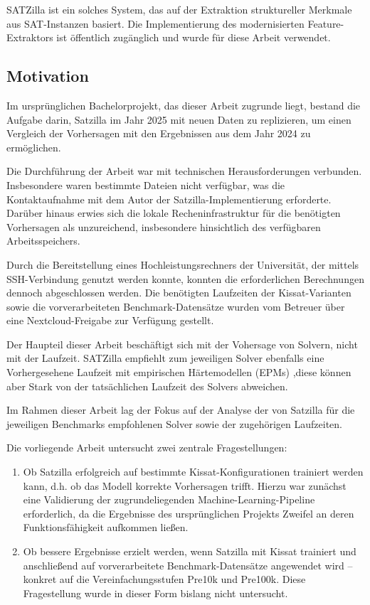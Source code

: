 SATZilla ist ein solches System, das auf der Extraktion struktureller Merkmale aus SAT-Instanzen 
basiert\cite{shavit2024satzilla}. Die Implementierung des modernisierten Feature-Extraktors ist 
öffentlich zugänglich und wurde für diese Arbeit verwendet.

\newpage

\subsection{Motivation}

Im ursprünglichen Bachelorprojekt, das dieser Arbeit zugrunde liegt, bestand die Aufgabe darin, Satzilla 
im Jahr 2025 mit neuen Daten zu replizieren, um einen Vergleich der Vorhersagen mit den Ergebnissen aus 
dem Jahr 2024 zu ermöglichen.

Die Durchführung der Arbeit war mit technischen Herausforderungen verbunden. Insbesondere waren bestimmte 
Dateien nicht verfügbar, was die Kontaktaufnahme mit dem Autor der Satzilla-Implementierung erforderte. 
Darüber hinaus erwies sich die lokale Recheninfrastruktur für die benötigten Vorhersagen als 
unzureichend, insbesondere hinsichtlich des verfügbaren Arbeitsspeichers.

Durch die Bereitstellung eines Hochleistungsrechners der Universität, der mittels SSH-Verbindung genutzt 
werden konnte, konnten die erforderlichen Berechnungen dennoch abgeschlossen werden. Die benötigten 
Laufzeiten der Kissat-Varianten sowie die vorverarbeiteten Benchmark-Datensätze wurden vom Betreuer 
über eine Nextcloud-Freigabe zur Verfügung gestellt.\cite{runtimes2025}

Der Haupteil dieser Arbeit beschäftigt sich mit der Vohersage von Solvern, nicht mit der Laufzeit. SATZilla 
empfiehlt zum jeweiligen Solver ebenfalls eine Vorhergesehene Laufzeit mit empirischen Härtemodellen (EPMs) 
,diese können aber Stark von der tatsächlichen Laufzeit des Solvers abweichen.\cite{shavit2024revisiting}

Im Rahmen dieser Arbeit lag der Fokus auf der Analyse der von Satzilla für die jeweiligen Benchmarks 
empfohlenen Solver sowie der zugehörigen Laufzeiten.

Die vorliegende Arbeit untersucht zwei zentrale Fragestellungen:

\begin{enumerate}
    \item Ob Satzilla erfolgreich auf bestimmte Kissat-Konfigurationen trainiert werden kann, d.h. ob 
    das Modell korrekte Vorhersagen trifft. Hierzu war zunächst eine Validierung der zugrundeliegenden
    Machine-Learning-Pipeline erforderlich, da die Ergebnisse des ursprünglichen Projekts Zweifel an 
    deren Funktionsfähigkeit aufkommen ließen.
    
    \item Ob bessere Ergebnisse erzielt werden, wenn Satzilla mit Kissat trainiert und anschließend auf 
    vorverarbeitete Benchmark-Datensätze angewendet wird – konkret auf die Vereinfachungsstufen 
    Pre10k und Pre100k. Diese Fragestellung wurde in dieser Form bislang nicht untersucht.
\end{enumerate}


